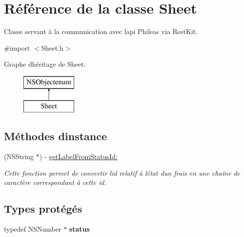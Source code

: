 \hypertarget{interface_sheet}{}\section{Référence de la classe Sheet}
\label{interface_sheet}


Classe servant à la communication avec l\textquotesingle{}api Phileas via Rest\+Kit.  




{\ttfamily \#import $<$Sheet.\+h$>$}

Graphe d\textquotesingle{}héritage de Sheet\+:\begin{figure}[H]
\begin{center}
\leavevmode
\includegraphics[height=2.000000cm]{interface_sheet}
\end{center}
\end{figure}
\subsection*{Méthodes d\textquotesingle{}instance}
\begin{DoxyCompactItemize}
\item 
(N\+S\+String $\ast$) -\/ \hyperlink{interface_sheet_a0aa2541c9ca00d9c78473cf55f271a42}{get\+Label\+From\+Status\+Id\+:}
\begin{DoxyCompactList}\small\item\em Cette fonction permet de convertir l\textquotesingle{}id relatif à l\textquotesingle{}état d\textquotesingle{}un frais en une chaîne de caractère correspondant à cette id. \end{DoxyCompactList}\end{DoxyCompactItemize}
\subsection*{Types protégés}
\begin{DoxyCompactItemize}
\item 
\hypertarget{interface_sheet_a1a7c6f48d943722212bea9c63726089d}{}typedef N\+S\+Number $\ast$ {\bfseries status}\label{interface_sheet_a1a7c6f48d943722212bea9c63726089d}

\end{DoxyCompactItemize}
